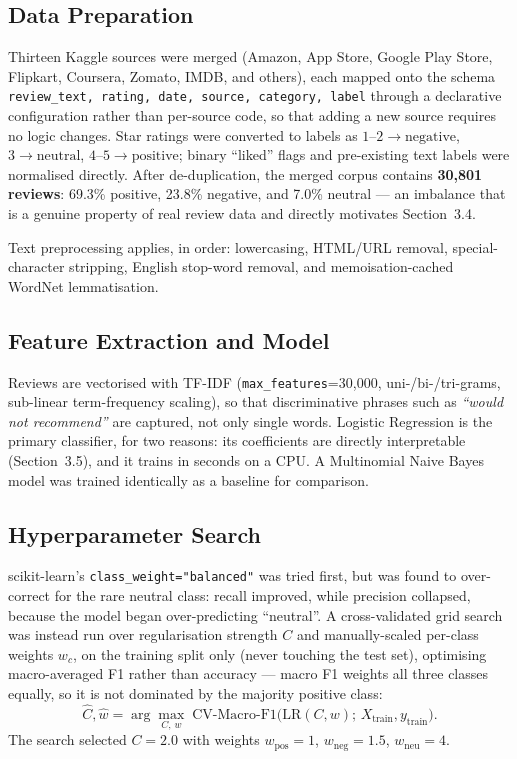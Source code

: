 \documentclass{article}
\begin{document}
\subsection{Data Preparation}
Thirteen Kaggle sources were merged (Amazon, App Store, Google Play Store,
Flipkart, Coursera, Zomato, IMDB, and others), each mapped onto the schema
\texttt{review\_text, rating, date, source, category, label} through a
declarative configuration rather than per-source code, so that adding a new
source requires no logic changes. Star ratings were converted to labels as
$1$--$2\!\to\!\text{negative}$, $3\!\to\!\text{neutral}$,
$4$--$5\!\to\!\text{positive}$; binary ``liked'' flags and pre-existing text
labels were normalised directly. After de-duplication, the merged corpus
contains \textbf{30{,}801 reviews}: 69.3\% positive, 23.8\% negative, and
7.0\% neutral — an imbalance that is a genuine property of real review data
and directly motivates Section~3.4.

Text preprocessing applies, in order: lowercasing, HTML/URL removal,
special-character stripping, English stop-word removal, and
memoisation-cached WordNet lemmatisation.

\subsection{Feature Extraction and Model}
Reviews are vectorised with TF-IDF (\texttt{max\_features}=30{,}000,
uni-/bi-/tri-grams, sub-linear term-frequency scaling), so that
discriminative phrases such as \emph{``would not recommend''} are captured,
not only single words. Logistic Regression is the primary classifier, for
two reasons: its coefficients are directly interpretable (Section~3.5), and
it trains in seconds on a CPU. A Multinomial Naive Bayes model was trained
identically as a baseline for comparison.

\subsection{Hyperparameter Search}
scikit-learn's \texttt{class\_weight="balanced"} was tried first, but was
found to over-correct for the rare neutral class: recall improved, while
precision collapsed, because the model began over-predicting ``neutral''.
A cross-validated grid search was instead run over regularisation strength
$C$ and manually-scaled per-class weights $w_c$, on the training split only
(never touching the test set), optimising macro-averaged F1 rather than
accuracy — macro F1 weights all three classes equally, so it is not
dominated by the majority positive class:
\begin{equation}
    \hat{C}, \hat{w} = \arg\max_{C,\,w}\; \text{CV-Macro-F1}\big(
        \text{LR}(C, w);\, X_{\text{train}}, y_{\text{train}} \big).
\end{equation}
The search selected $C{=}2.0$ with weights $w_{\text{pos}}{=}1$,
$w_{\text{neg}}{=}1.5$, $w_{\text{neu}}{=}4$.
\end{document}
